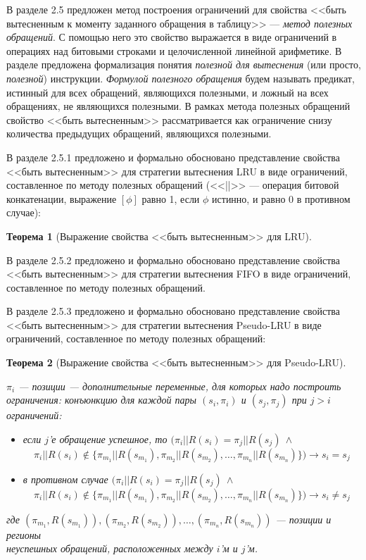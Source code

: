 \documentclass[14pt,autoref,href
,facsimile
]{disser}
\newtheorem{theorem}{Теорема}
\newcommand{\LRU}{LRU\xspace}
\newcommand{\FIFO}{FIFO\xspace}
\newcommand{\PseudoLRU}{Pseudo-LRU\xspace}
\begin{document}
В разделе 2.5 предложен метод построения ограничений для свойства <<быть вытесненным к моменту заданного обращения в таблицу>> --- \emph{метод полезных обращений}. С помощью него это свойство выражается в виде ограничений в операциях над битовыми строками и целочисленной линейной арифметике. В разделе предложена формализация понятия \emph{полезной для вытеснения} (или просто, \emph{полезной}) инструкции. \emph{Формулой полезного обращения} будем называть предикат, истинный для всех обращений, являющихся полезными, и ложный на всех обращениях, не являющихся полезными. В рамках метода полезных обращений свойство <<быть вытесненным>> рассматривается как ограничение снизу количества предыдущих обращений, являющихся полезными.

В разделе 2.5.1 предложено и формально обосновано представление свойства <<быть вытесненным>> для стратегии вытеснения LRU в виде ограничений, составленное по методу полезных обращений (<<||>> --- операция битовой конкатенации, выражение $[\phi]$ равно 1, если $\phi$ истинно, и равно 0 в противном случае):
\begin{theorem}[Выражение свойства <<быть вытесненным>> для \LRU]\label{correct_mirror_LRU} \LRUusefuls
\end{theorem}

В разделе 2.5.2 предложено и формально обосновано представление свойства <<быть вытесненным>> для стратегии вытеснения \FIFO  в виде ограничений, составленное по методу полезных обращений.

В разделе 2.5.3 предложено и формально обосновано представление свойства <<быть вытесненным>> для стратегии вытеснения \PseudoLRU в виде ограничений, составленное по методу полезных обращений:
\begin{theorem}[Выражение свойства <<быть вытесненным>> для \PseudoLRU]\label{correct_mirror_PLRU} \PLRUusefuls

$\pi_i$ --- позиции --- дополнительные переменные, для которых надо построить ограничения:
конъюнкцию для каждой пары $(s_i,\pi_i)$ и $(s_j, \pi_j)$ при $j > i$ ограничений:
\begin{itemize}
    \item если $j$'е обращение успешное, то $(\pi_i||R(s_i) =
\pi_j||R(s_j)~\wedge$ $$\pi_i||R(s_i) \notin \{\pi_{m_1}||R(s_{m_1}),
\pi_{m_2}||R(s_{m_2}), \dots, \pi_{m_n}||R(s_{m_n})\}) \rightarrow s_i = s_j$$
    \item в противном случае $(\pi_i||R(s_i) =
\pi_j||R(s_j)~\wedge$ $$\pi_i||R(s_i) \notin \{\pi_{m_1}||R(s_{m_1}),
\pi_{m_2}||R(s_{m_2}), \dots, \pi_{m_n}||R(s_{m_n})\}) \rightarrow s_i \neq
s_j$$
\end{itemize}
где $(\pi_{m_1},R(s_{m_1})), (\pi_{m_2},R(s_{m_2})), \dots,
(\pi_{m_n},R(s_{m_n}))$ --- позиции и регионы\\неуспешных обращений,
расположенных между $i$'м и $j$'м.
\end{theorem}
\end{document}
